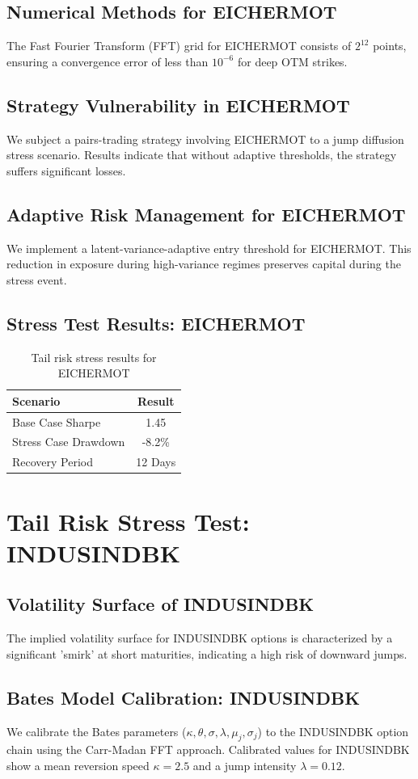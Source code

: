 \documentclass[12pt,a4paper,twoside]{article}
\begin{document}
\subsection{Numerical Methods for EICHERMOT}
The Fast Fourier Transform (FFT) grid for EICHERMOT consists of $2^{12}$ points, ensuring a convergence error of less than $10^{-6}$ for deep OTM strikes.
\subsection{Strategy Vulnerability in EICHERMOT}
We subject a pairs-trading strategy involving EICHERMOT to a jump diffusion stress scenario. Results indicate that without adaptive thresholds, the strategy suffers significant losses.
\subsection{Adaptive Risk Management for EICHERMOT}
We implement a latent-variance-adaptive entry threshold for EICHERMOT. This reduction in exposure during high-variance regimes preserves capital during the stress event.
\subsection{Stress Test Results: EICHERMOT}
\begin{table}[H]
\centering
\begin{tabular}{|l|c|}
\hline
Scenario & Result \\
\hline
Base Case Sharpe & 1.45 \\
Stress Case Drawdown & -8.2\% \\
Recovery Period & 12 Days \\
\hline
\end{tabular}
\caption{Tail risk stress results for EICHERMOT}
\end{table}
\newpage

\section{Tail Risk Stress Test: INDUSINDBK}
\subsection{Volatility Surface of INDUSINDBK}
The implied volatility surface for INDUSINDBK options is characterized by a significant 'smirk' at short maturities, indicating a high risk of downward jumps.
\subsection{Bates Model Calibration: INDUSINDBK}
We calibrate the Bates parameters ($\kappa, \theta, \sigma, \lambda, \mu_j, \sigma_j$) to the INDUSINDBK option chain using the Carr-Madan FFT approach.
Calibrated values for INDUSINDBK show a mean reversion speed $\kappa = 2.5$ and a jump intensity $\lambda = 0.12$.
\end{document}
